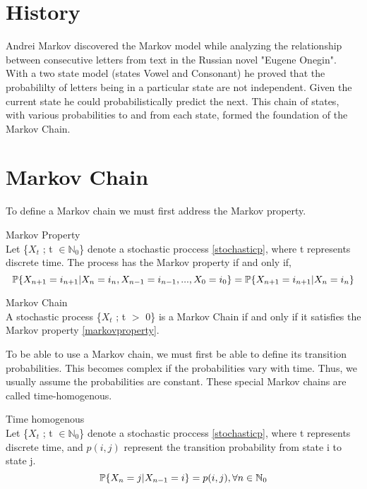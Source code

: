 \section{History}
Andrei Markov discovered the Markov model while analyzing the relationship between consecutive letters from text in the Russian novel "Eugene Onegin". With a two state model (states Vowel and Consonant) he proved that the probabililty of letters being in a particular state are not independent. Given the current state he could probabilistically predict the next. This chain of states, with various probabilities to and from each state, formed the foundation of the Markov Chain.

\section{Markov Chain}
To define a Markov chain we must first address the Markov property.

\begin{definition}
\label{markovproperty}
	Markov Property \\
	Let \{$X_t$ ; t $\in \mathbb{N}_0$\} denote a stochastic proccess \ref{stochasticp}, where t 				represents discrete time. The process has the Markov property if and only if,
	\begin{equation}
		\mathbb{P} \{X_{n+1} = i_{n+1} | X_n = i_n, X_{n-1} = i_{n-1},...,X_0 = i_0\} = \mathbb{P} \{X_{n+1} = 				i_{n+1} | X_n = i_n\}
	\end{equation}
\end{definition}

\begin{definition}
\label{markovchain}
	Markov Chain \\
	A stochastic process \{$X_t$ ; t $>$ 0\} is a Markov Chain if and only if it satisfies the Markov 			property \ref{markovproperty}.
\end{definition}

To be able to use a Markov chain, we must first be able to define its transition probabilities. This becomes complex if the probabilities vary with time. Thus, we usually assume the probabilities are constant. These special Markov chains are called time-homogenous.  

\begin{definition}
\label{timehomogenous}
	Time homogenous \\
	Let \{$X_t$ ; t $\in \mathbb{N}_0$\} denote a stochastic proccess \ref{stochasticp}, where t 				represents discrete time, and $p(i,j)$ represent the transition probability from state i to state j. 
	\begin{equation}
		\mathbb{P} \{X_n = j | X_{n-1} = i\} = p(i,j),       \forall n \in \mathbb{N}_0
	\end{equation}
\end{definition}

